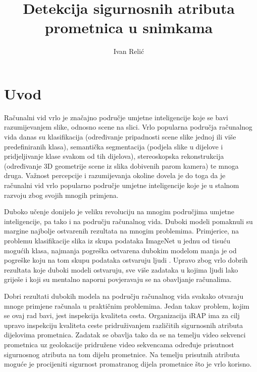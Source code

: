 \documentclass[times, utf8, diplomski, numeric]{fer}
\begin{document}
\nocite{*}


\title{Detekcija sigurnosnih atributa prometnica u snimkama}

\author{Ivan Relić}

\maketitle

\izvornik

\zahvala{}

\tableofcontents

\chapter{Uvod}
Računalni vid vrlo je značajno područje umjetne inteligencije koje se bavi razumijevanjem slike, odnosno scene na slici. 
Vrlo popularna područja računalnog vida danas su klasifikacija (određivanje pripadnosti scene slike jednoj ili više predefiniranih klasa), semantička segmentacija (podjela slike u dijelove i pridjeljivanje klase svakom od tih dijelova), stereoskopska rekonstrukcija (određivanje 3D geometrije scene iz slika dobivenih parom kamera) te mnoga druga.
Važnost percepcije i razumijevanja okoline dovela je do toga da je računalni vid vrlo popularno područje umjetne inteligencije koje je u stalnom razvoju zbog svojih mnogih primjena.

Duboko učenje donijelo je veliku revoluciju na mnogim područjima umjetne inteligencije, pa tako i na području računalnog vida. 
Duboki modeli pomaknuli su margine najbolje ostvarenih rezultata na mnogim problemima. 
Primjerice,  na problemu klasifikacije slika iz skupa podataka ImageNet \citep{dataset:imagenet} u jednu od tisuću mogućih klasa, najmanja pogreška ostvarena dubokim modelom manja je od pogreške koju na tom skupu podataka ostvaruju ljudi \citep{article:delving_deep_into_rectifiers}. 
Upravo zbog vrlo dobrih rezultata koje duboki modeli ostvaruju, sve više zadataka u kojima ljudi lako griješe i koji su mentalno naporni povjeravaju se na obavljanje računalima.

Dobri rezultati dubokih modela na području računalnog vida svakako otvaraju mnoge primjene računala u praktičnim problemima. 
Jedan takav problem, kojim se ovaj rad bavi, jest inspekcija kvaliteta cesta. 
Organizacija iRAP  ima za cilj upravo inspekciju kvaliteta ceste pridruživanjem različitih sigurnosnih atributa dijelovima prometnica.
Zadatak se obavlja tako da se na temelju video sekvenci prometnica uz geolokacije pridružene video sekvencama određuje prisutnost sigurnosnog atributa na tom dijelu prometnice.
Na temelju prisutnih atributa moguće je procijeniti sigurnost promatranog dijela prometnice što je vrlo korisno.
\end{document}
